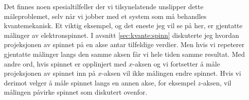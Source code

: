 Det finnes noen spesialtilfeller der vi tilsynelatende unslipper dette måle\-problemet, selv når vi jobber med et system som må behandles kvante\-mekanisk. Et viktig eksempel, og det eneste jeg vil se på her, er gjentatte målinger av elektronspinnet. I avsnitt \ref{sec:kvante:spinn} diskuterte jeg hvordan projeksjonen av spinnet på en akse antar tilfeldige verdier. Men hvis vi repeterer gjentatte målinger langs den samme aksen får vi hele tiden samme resultat. Med andre ord, hvis spinnet er opplinjert med $x$-aksen og vi fortsetter å måle projeksjonen av spinnet inn på $x$-aksen vil ikke målingen endre spinnet. Hvis vi derimot velger å måle spinnet langs en annen akse, for eksempel $z$-aksen, vil målingen påvirke spinnet som diskutert ovenfor.